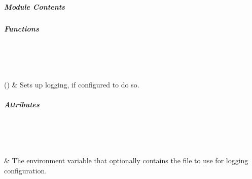 \documentclass[letterpaper,10pt,english]{sphinxmanual}
\begin{document}
\subparagraph{Module Contents}
\label{\detokenize{autoapi/pine/client/log/index:module-contents}}

\subparagraph{Functions}
\label{\detokenize{autoapi/pine/client/log/index:functions}}

\begin{savenotes}\sphinxatlongtablestart\begin{longtable}[c]{}
\hline

\endfirsthead

%
{}\\
\hline

\endhead

\hline
{}\\
\endfoot

\endlastfoot

\sphinxAtStartPar
{\hyperref[\detokenize{autoapi/pine/client/log/index:pine.client.log.setup_logging}]{}}()
&
\sphinxAtStartPar
Sets up logging, if configured to do so.
\\
\hline
\end{longtable}\sphinxatlongtableend\end{savenotes}


\subparagraph{Attributes}
\label{\detokenize{autoapi/pine/client/log/index:attributes}}

\begin{savenotes}\sphinxatlongtablestart\begin{longtable}[c]{}
\hline

\endfirsthead

%
{}\\
\hline

\endhead

\hline
{}\\
\endfoot

\endlastfoot

\sphinxAtStartPar
{\hyperref[\detokenize{autoapi/pine/client/log/index:pine.client.log.CONFIG_FILE_ENV}]{}}
&
\sphinxAtStartPar
The environment variable that optionally contains the file to use for logging configuration.
\\
\hline
\end{longtable}\sphinxatlongtableend\end{savenotes}
\end{document}
